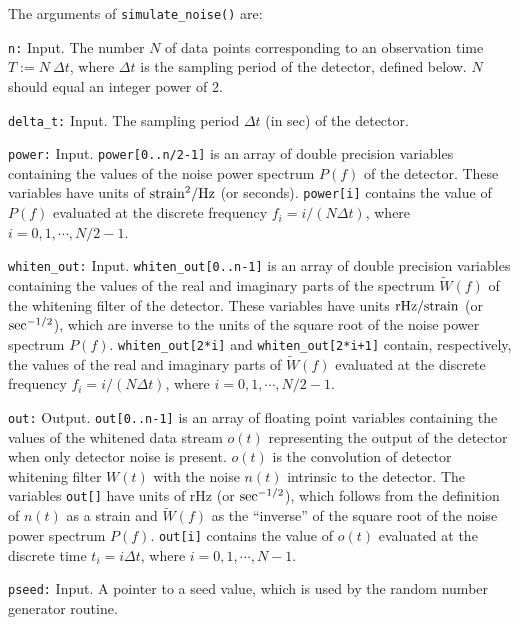 The arguments of {\tt simulate\_noise()} are:
\begin{description}
%
\item{\tt n:} Input. 
The number $N$ of data points corresponding to an observation
time $T:=N\ \Delta t$, where 
$\Delta t$ is the sampling period of the detector, defined below.
$N$ should equal an integer power of 2.
%
\item{\tt delta\_t:} Input.  
The sampling period $\Delta t$ (in sec) of the detector. 
%
\item{\tt power:} Input.  
{\tt power[0..n/2-1]} is an array of double precision variables 
containing the values of the noise power spectrum $P(f)$ of the 
detector.
These variables have units of ${\rm strain}^2/{\rm Hz}$ (or seconds).
{\tt power[i]} contains the value of $P(f)$ evaluated at the discrete
frequency $f_i=i/(N\Delta t)$, where $i=0,1,\cdots,N/2-1$.
%
\item{\tt whiten\_out:} Input.
{\tt whiten\_out[0..n-1]} is an array of double precision variables 
containing the values of the real and imaginary parts of the spectrum 
$\tilde W(f)$ of the whitening filter of the detector.
These variables have units ${\rm rHz}/{\rm strain}$ 
(or ${\rm sec}^{-1/2}$), which are inverse to the units of the square 
root of the noise power spectrum $P(f)$.
{\tt whiten\_out[2*i]} and {\tt whiten\_out[2*i+1]} contain, respectively, 
the values of the real and imaginary parts of $\tilde W(f)$
evaluated at the discrete frequency $f_i=i/(N\Delta t)$, where 
$i=0,1,\cdots,N/2-1$.
%
\item{\tt out:} Output.  
{\tt out[0..n-1]} is an array of floating point variables containing
the values of the whitened data stream $o(t)$ representing the 
output of the detector when only detector noise is present.
$o(t)$ is the convolution of detector whitening filter $W(t)$
with the noise $n(t)$ intrinsic to the detector.
The variables {\tt out[]} have units of rHz (or ${\rm sec}^{-1/2}$),
which follows from the definition of $n(t)$ as a strain and
$\tilde W(f)$ as the ``inverse'' of the square root
of the noise power spectrum $P(f)$.
{\tt out[i]} contains the value of $o(t)$ evaluated at the discrete 
time $t_i=i\Delta t$, where $i=0,1,\cdots,N-1$.
%
\item{\tt pseed:} Input.  
A pointer to a seed value, which is used by the random number generator
routine.
\end{description}

